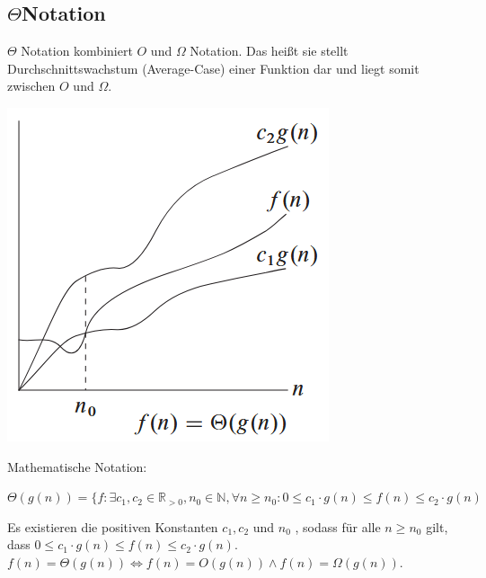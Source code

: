 \documentclass[
../../AuD-Zusammenfassung.tex,
]
{subfiles}
\begin{document}
\newpage 
\subsection{$\Theta$\space Notation}
$\Theta$ Notation kombiniert $O$ und $\Omega$ Notation. Das heißt sie stellt  Durchschnittswachstum (Average-Case) einer Funktion dar und liegt somit zwischen $O$ und $\Omega$. 
\begin{center}
    \includegraphics[scale=0.6]{Pics/LandauNotation.png}
\end{center}

Mathematische Notation:
\begin{center}
    $\Theta(g(n)) = \{f: \exists c_1, c_2 \in \mathbb{R}_{>0}, n_0 \in \mathbb{N}, \forall n \geq n_0:  0 \leq c_1 \cdot g(n) \leq f(n) \leq c_2 \cdot g(n)$
\end{center}
Es existieren die positiven Konstanten $c_1, c_2$ und $n_0$ , sodass für alle $n \geq n_0$ gilt, dass  $0 \leq c_1 \cdot g(n) \leq f(n) \leq c_2 \cdot g(n)$. \\
$f(n) = \Theta(g(n)) \Longleftrightarrow f(n) = O(g(n)) \wedge f(n) = \Omega(g(n))$.\\
\end{document}
